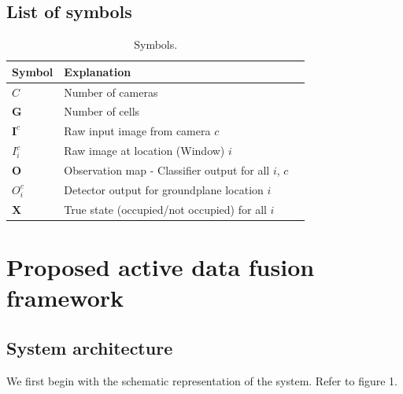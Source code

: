 \documentclass[10pt,twocolumn,letterpaper]{article}
\begin{document}


\subsection{List of symbols}
\begin{table}[ht]
  \begin{tabular}{lll}
   \hline
   Symbol & Explanation \\
   \hline
   $C $ & Number of cameras\\
   $\textbf{G} $ & Number of cells\\
   $ \textbf{I}^{c} $ & Raw input image from camera $ c$\\
   $ I_{i}^{c} $ & Raw image at location (Window) $ i$\\
   $ \textbf{O} $ & Observation map - Classifier output for all  $ i $, $ c $\\
   $O^{c}_{i} $& Detector output for groundplane location $ i $\\
   $\textbf{X}$& True state (occupied/not occupied) for all $i$\\
   \hline
  \end{tabular}
  \caption{%
    Symbols.
  }
  \label{tab:Formal symbols}
\end{table}

\section{Proposed active data fusion framework}

\subsection{System architecture}
We first begin with the schematic representation of the system. Refer to figure 1.
\end{document}
